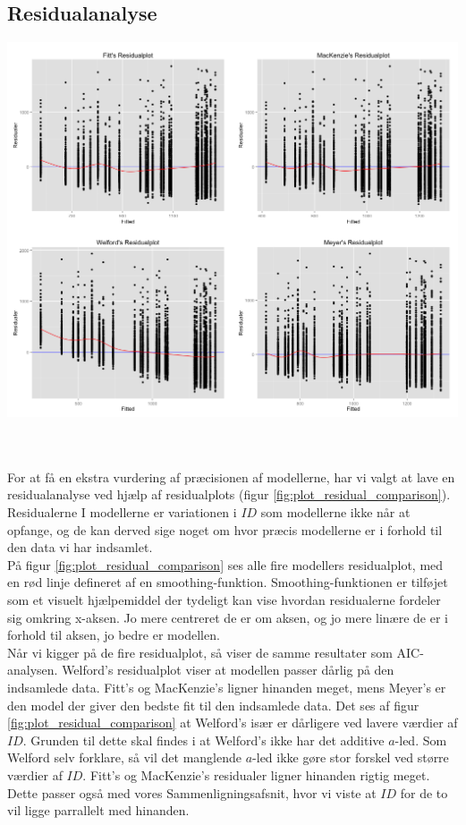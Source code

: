 \subsection*{Residualanalyse}
\begin{minipage}{\textwidth}
	\centering
	\includegraphics[width=\textwidth]{images/plots/plot_residual_comparison}
	\label{fig:plot_residual_comparison}
\end{minipage}\\\\
For at få en ekstra vurdering af præcisionen af modellerne, har vi valgt at lave en residualanalyse ved hjælp af residualplots (figur \ref{fig:plot_residual_comparison}). Residualerne I modellerne er variationen i $ID$ som modellerne ikke når at opfange, og de kan derved sige noget om hvor præcis modellerne er i forhold til den data vi har indsamlet.\\
På figur \ref{fig:plot_residual_comparison} ses alle fire modellers residualplot, med en rød linje defineret af en smoothing-funktion. Smoothing-funktionen er tilføjet som et visuelt hjælpemiddel der tydeligt kan vise hvordan residualerne fordeler sig omkring x-aksen. Jo mere centreret de er om aksen, og jo mere linære de er i forhold til aksen, jo bedre er modellen.\\
Når vi kigger på de fire residualplot, så viser de samme resultater som AIC-analysen. Welford's residualplot viser at modellen passer dårlig på den indsamlede data. Fitt's og MacKenzie's ligner hinanden meget, mens Meyer's er den model der giver den bedste fit til den indsamlede data.
Det ses af figur \ref{fig:plot_residual_comparison} at Welford's især er dårligere ved lavere værdier af $ID$. Grunden til dette skal findes i at Welford's ikke har det additive $a$-led. Som Welford \cite{welford1968} selv forklare, så vil det manglende $a$-led ikke gøre stor forskel ved større værdier af $ID$. Fitt's og MacKenzie's residualer ligner hinanden rigtig meget. Dette passer også med vores Sammenligningsafsnit, hvor vi viste at $ID$ for de to vil ligge parrallelt med hinanden.


\nocite{*}
\newpage

\printbibliography

